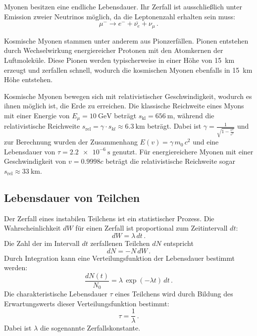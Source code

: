 Myonen besitzen eine endliche Lebensdauer. Ihr Zerfall ist ausschließlich unter Emission zweier Neutrinos möglich, da die Leptonenzahl erhalten sein muss:
\begin{equation*}
    \mu^- \rightarrow e^- + \bar{\nu_{e}} + \nu_{\mu} \, .
\end{equation*}

Kosmische Myonen stammen unter anderem aus Pionzerfällen. 
Pionen entstehen durch Wechselwirkung energiereicher Protonen mit den Atomkernen der Luftmoleküle. 
Diese Pionen werden typischerweise in einer Höhe von \SI{15}{\kilo\metre} erzeugt und zerfallen schnell, 
wodurch die kosmischen Myonen ebenfalls in \SI{15}{\kilo\metre} Höhe entstehen. \cite{Grupen}

Kosmische Myonen bewegen sich mit relativistischer Geschwindigkeit, wodurch es ihnen möglich ist, die Erde zu erreichen. 
Die klassische Reichweite eines Myons mit einer Energie von $E_{\mu} = \SI{10}{\giga\electronvolt}$ 
beträgt $s_\text{kl} = \SI{656}{\meter}$, während die relativistische 
Reichweite $s_\text{rel} = \gamma \cdot s_{kl} \approx \SI{6.3}{\kilo\metre}$ beträgt. 
Dabei ist $\gamma = \frac{1}{\sqrt{1 - \frac{v^2}{c^2}}}$ und zur 
Berechnung wurden der Zusammenhang $E(v) = \gamma \, m_0 \, c^2$ und eine 
Lebensdauer von $\tau = \SI{2.2e-6}{\second}$ genutzt. Für energiereichere 
Myonen mit einer Geschwindigkeit von $v = \num{0.9998} c$ beträgt die relativistische 
Reichweite sogar $s_\text{rel} \approx \SI{33}{\kilo\metre}$.


\subsection{Lebensdauer von Teilchen}
Der Zerfall eines instabilen Teilchens ist ein statistischer Prozess. Die Wahrscheinlichkeit $dW$ für einen Zerfall ist proportional zum Zeitintervall $dt$:
\begin{equation*}
    dW = \lambda \, dt \, .
\end{equation*}
Die Zahl der im Intervall $dt$ zerfallenen Teilchen $dN$ entspricht
\begin{equation*}
    dN = - N \, dW \, .
\end{equation*}
Durch Integration kann eine Verteilungsfunktion der Lebensdauer bestimmt werden:
\begin{equation}
    \frac{dN(t)}{N_0} = \lambda \, \exp(- \lambda t) \, dt \, .
    \label{eq:verteilung}
\end{equation}
Die charakteristische Lebensdauer $\tau$ eines Teilchens wird durch Bildung des Erwartungswerts dieser Verteilungsfunktion bestimmt:
\begin{equation}
    \tau = \frac{1}{\lambda} \, .
    \label{eq:tau}
\end{equation}
Dabei ist $\lambda$ die sogenannte Zerfallskonstante.


